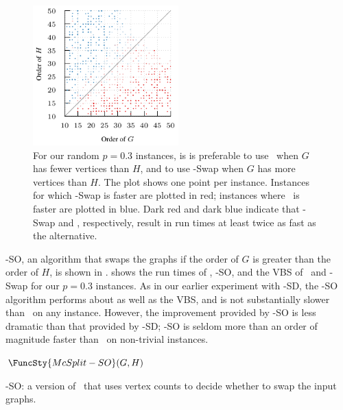 \begin{figure}[h!]
    \centering
    \includegraphics*[width=0.5\textwidth]{14-mcsplit-i-undirected/modified-mcsplit-experiment/plots/plots/order-when-swap}
    \caption{For our random $p=0.3$ instances, is is preferable to use \McSplit\ when $G$
        has fewer vertices than $H$, and to use \McSplit-Swap when $G$ has more vertices than $H$.
        The plot shows one point per instance.  Instances for which \McSplit-Swap
        is faster are plotted in red; instances where \McSplit\ is faster
        are plotted in blue.  Dark red and dark blue indicate that \McSplit-Swap and \McSplit,
        respectively, result in run times at least twice as fast as the alternative.}
    \label{figure:order-when-swap}
\end{figure}

\McSplit-SO, an algorithm that swaps the graphs if the order of $G$ is greater than the
order of $H$, is shown in .
 shows the run times of \McSplit, \McSplit-SO,
and the VBS of \McSplit\ and \McSplit-Swap for our $p=0.3$ instances.  As in our earlier
experiment with \McSplit-SD, the \McSplit-SO algorithm performs about as well as the
VBS, and is not substantially slower than \McSplit\ on any instance.  However, the improvement
provided by \McSplit-SO is less dramatic than that provided by \McSplit-SD; \McSplit-SO
is seldom more than an order of magnitude faster than \McSplit\ on non-trivial instances.

\begin{algorithm}[h!]
\DontPrintSemicolon
\nl $\FuncSty{McSplit-SO}(G, H)$ \label{McSplitSOFun} \;
\nl {}
    \caption{\McSplit-SO: a version of \McSplit\ that uses vertex counts to decide whether to swap the input graphs.} 
\label{McSplitSOAlg}
\end{algorithm}

